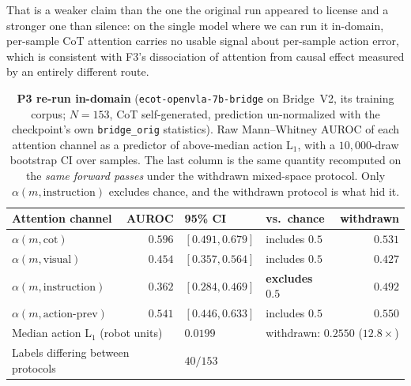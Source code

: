 \documentclass{article}
\begin{document}
That is a weaker claim than the one the original run appeared to license and a stronger one than silence: on the single model where we can run it in-domain, per-sample CoT attention carries no usable signal about per-sample action error, which is consistent with F3's dissociation of attention from causal effect measured by an entirely different route.

\begin{table}[t]
\centering\small
\caption{\textbf{P3 re-run in-domain} (\texttt{ecot-openvla-7b-bridge} on Bridge~V2, its training corpus; $N{=}153$, CoT self-generated, prediction un-normalized with the checkpoint's own \texttt{bridge\_orig} statistics). Raw Mann--Whitney AUROC of each attention channel as a predictor of above-median action L$_1$, with a $10{,}000$-draw bootstrap CI over samples. The last column is the same quantity recomputed on the \emph{same forward passes} under the withdrawn mixed-space protocol. Only $\alpha(m,\text{instruction})$ excludes chance, and the withdrawn protocol is what hid it.}
\label{tab:p3}
\begin{tabular}{l r l l r}
\toprule
Attention channel & AUROC & 95\% CI & vs.\ chance & withdrawn \\
\midrule
$\alpha(m, \text{cot})$        & $0.596$ & $[0.491, 0.679]$ & includes $0.5$ & $0.531$ \\
$\alpha(m, \text{visual})$     & $0.454$ & $[0.357, 0.564]$ & includes $0.5$ & $0.427$ \\
$\alpha(m, \text{instruction})$& $\mathbf{0.362}$ & $\mathbf{[0.284, 0.469]}$ & \textbf{excludes} $\mathbf{0.5}$ & $0.492$ \\
$\alpha(m, \text{action-prev})$& $0.541$ & $[0.446, 0.633]$ & includes $0.5$ & $0.550$ \\
\midrule
\multicolumn{2}{l}{Median action L$_1$ (robot units)} & $0.0199$ & \multicolumn{2}{l}{withdrawn: $0.2550$ ($12.8\times$)} \\
\multicolumn{2}{l}{Labels differing between protocols} & $40/153$ & \multicolumn{2}{l}{} \\
\bottomrule
\end{tabular}
\end{table}
\end{document}
